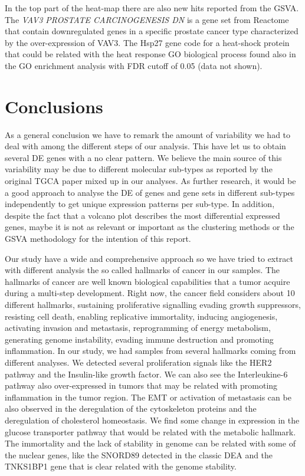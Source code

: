 \documentclass[9pt,twocolumn,twoside]{gsajnl}
\begin{document}
In the top part of the heat-map there are also new hits reported from the GSVA. The  \textit{VAV3 PROSTATE CARCINOGENESIS DN} \citep{liu2008targeted} is a gene set from Reactome that contain downregulated genes in a specific prostate cancer type characterized by the over-expression of VAV3. The Hsp27 gene code for a heat-shock protein that could be related with the heat response GO biological process found also in the GO enrichment analysis with FDR cutoff of 0.05 (data not shown).


\section*{Conclusions}

As a general conclusion we have to remark the amount of variability we had to deal with among the different steps of our analysis. This have let us to obtain several DE genes with a no clear pattern. We believe the main source of this variability may be due to different molecular sub-types as reported by the original TGCA paper \citep{Abeshouse2015} mixed up in our analyses.  As further research, it would be a good approach to analyse the DE of genes and gene sets in different sub-types independently to get unique expression patterns per sub-type. In addition, despite the fact that a volcano plot describes the most differential expressed genes, maybe it is not as relevant or important as the clustering methods or the GSVA methodology for the intention of this report.

Our study have a wide and comprehensive approach so we have tried to extract with different analysis the so called hallmarks of cancer in our samples. The hallmarks of cancer are well known biological capabilities that a tumor acquire during a multi-step development. Right now, the cancer field considers about 10 different hallmarks, sustaining proliferative signalling
evading growth suppressors, resisting cell death, enabling replicative immortality, inducing angiogenesis, activating invasion and metastasis, reprogramming of energy metabolism, generating genome instability,  evading immune destruction and promoting inflammation\citep{hanahan2011hallmarks}. In our study, we had samples from several hallmarks coming from different analyses. We detected several proliferation signals like the HER2 pathway and the Insulin-like growth factor. We can also see the Interleukine-6 pathway also over-expressed in tumors that may be related with promoting inflammation in the tumor region. The EMT or activation of metastasis can be also observed in the deregulation of the cytoskeleton proteins and the deregulation of cholesterol homeostasis. We find some change in expression in the glucose transporter pathway that would be related with the metabolic hallmark. The immortality and the lack of stability in genome can be related with some of the nuclear genes, like the SNORD89 detected in the classic DEA and the TNKS1BP1 gene that is clear related with the genome stability. 
\end{document}
